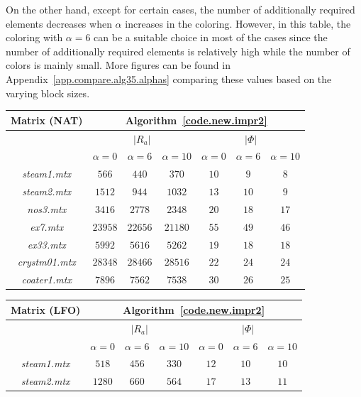 \documentclass[12pt, twoside,a4paper,toc=bibliography]{scrbook}
\newcommand{\coderef}[1]{Algorithm~\protect\ref{#1}}
\newcommand{\appref}[1]{Appendix~\protect\ref{#1}}
\begin{document}
On the other hand, except for certain cases, 
the number of additionally required elements decreases 
when $\alpha$ increases in the coloring.
However, in this table,
the coloring with $\alpha=6$ can be a suitable choice in most of the cases
since the number of additionally required elements is relatively high
while the number of colors is mainly small.
More figures can be found in \appref{app.compare.alg35.alphas} comparing these values
based on the varying block sizes.

\begin{table}
\centering
\begin{tabular}{|c|c|c|c|c|c|c|}
\hline
Matrix (NAT) & \multicolumn{6}{c|}{\coderef{code.new.impr2}} \\\hline
{} & \multicolumn{3}{c|}{$|R_{a}|$} & \multicolumn{3}{c|}{$|\Phi|$}\\\hline
{}     & $\alpha=0$ & $\alpha=6$ & $\alpha=10$ & $\alpha=0$& $\alpha=6$&$\alpha=10$ \\\hline
\textit{steam1.mtx} & $566$ & $440$ & $370$ & $10$ & $9$ & $8$ \\\hline
\textit{steam2.mtx} & $1512$ & $944$ & $1032$ & $13$ & $10$ & $9$ \\\hline
\textit{nos3.mtx} & $3416$ & $2778$ & $2348$ & $20$ & $18$ & $17$ \\\hline
\textit{ex7.mtx} & $23958$ & $22656$ & $21180$ & $55$ & $49$ & $46$ \\\hline
\textit{ex33.mtx} & $5992$ & $5616$ & $5262$ & $19$ & $18$ & $18$ \\\hline
\textit{crystm01.mtx} & $28348$ & $28466$ & $28516$ & $22$ & $24$ & $24$ \\\hline
\textit{coater1.mtx} & $7896$ & $7562$ & $7538$ & $30$ & $26$ & $25$ \\\hline
\end{tabular}
\vspace*{1cm}\newline
\begin{tabular}{|c|c|c|c|c|c|c|}
\hline
Matrix (LFO) & \multicolumn{6}{c|}{\coderef{code.new.impr2}} \\\hline
{} & \multicolumn{3}{c|}{$|R_{a}|$} & \multicolumn{3}{c|}{$|\Phi|$}\\\hline
{} & $\alpha=0$ & $\alpha=6$ & $\alpha=10$ & $\alpha=0$& $\alpha=6$&$\alpha=10$ \\\hline
\textit{steam1.mtx} & $518$ & $456$ & $330$ & $12$ & $10$ & $10$ \\\hline
\textit{steam2.mtx} & $1280$ & $660$ & $564$ & $17$ & $13$ & $11$ \\\hline

\end{tabular}
\end{table}
\end{document}
